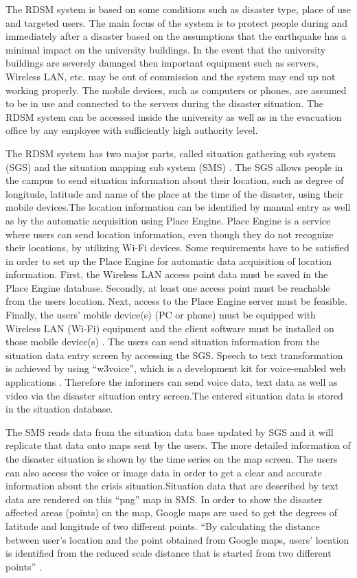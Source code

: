 The RDSM system is based on some conditions such as disaster type, place of use and targeted users. The main focus of the system is to protect people during and immediately after a disaster based on the assumptions that the earthquake has a minimal impact on the university buildings. In the event that the university buildings are severely damaged then important equipment such as servers, Wireless LAN, etc. may be out of commission and the system may end up not working properly. The mobile devices, such as computers or phones, are assumed to be in use and connected to the servers during the disaster situation. The RDSM system can be accessed inside the university as well as in the evacuation office by any employee with sufficiently high authority level.

The RDSM system has two major parts, called situation gathering sub system (SGS) and the situation mapping sub system (SMS) \cite{springlink}. The SGS allows people in the campus to send situation information about their location, such as degree of longitude, latitude and name of the place at the time of the disaster, using their mobile devices.The location information can be identified by manual entry as well as by the automatic acquisition using Place Engine. Place Engine is a service where users can send location information, even though they do not recognize their locations, by utilizing Wi-Fi devices. Some requirements have to be satisfied in order to set up the Place Engine for automatic data acquisition of location information. First, the Wireless LAN access point data must be saved in the Place Engine database. Secondly, at least one access point must be reachable from the users  location. Next, access to the Place Engine server must be feasible. Finally, the users’ mobile device(s) (PC or phone) must be equipped with Wireless LAN (Wi-Fi) equipment and the client software must be installed on those mobile device(s) \cite{springlink}. The users can send situation information from the situation data entry screen by accessing the SGS. Speech to text transformation is achieved by using “w3voice”, which is a development kit for voice-enabled web applications \cite{springlink}. Therefore the informers can send voice data, text data as well as video via the disaster situation entry screen.The entered situation data is stored in the situation database. 

The SMS reads data from the situation data base updated by SGS and it will replicate that data onto maps sent by the users. The more detailed information of the disaster situation is shown by the time series on the map screen. The users can also access the voice or image data  in order to get a clear and accurate information about the crisis situation.Situation data that are described by text data are rendered on this “png” map in SMS. In order to show the disaster affected areas (points) on the map, Google maps are used to get the degrees of latitude and longitude of two different points. “By calculating the distance between user’s location and the point obtained from Google maps, users’ location is identified from the reduced scale distance that is started from two different points” \cite{springlink}.


